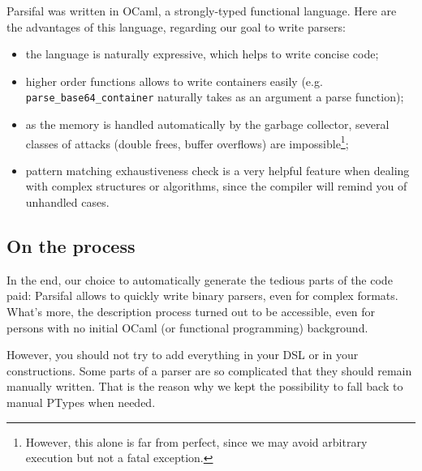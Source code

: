 \documentclass[conference]{IEEEtran}
\begin{document}
Parsifal was written in OCaml, a strongly-typed functional
language. Here are the advantages of this language, regarding our goal
to write parsers:
\begin{itemize}
\item the language is naturally expressive, which helps to write
  concise code;
\item higher order functions allows to write containers easily
  (e.g. \texttt{parse\_base64\_container} naturally takes as an
  argument a parse function);
\item as the memory is handled automatically by the garbage collector,
  several classes of attacks (double frees, buffer overflows) are
  impossible\footnote{However, this alone is far from perfect, since
    we may avoid arbitrary execution but not a fatal exception.};

\vfill \break

\item pattern matching exhaustiveness check is a very helpful feature
  when dealing with complex structures or algorithms, since the
  compiler will remind you of unhandled cases.
\end{itemize}



\subsection*{On the process}

In the end, our choice to automatically generate the tedious parts of
the code paid: Parsifal allows to quickly write binary parsers, even
for complex formats. What's more, the description process turned out
to be accessible, even for persons with no initial OCaml (or
functional programming) background.

However, you should not try to add everything in your DSL or in your
constructions. Some parts of a parser are so complicated that they
should remain manually written. That is the reason why we kept the
possibility to fall back to manual PTypes when needed.



\end{document}
